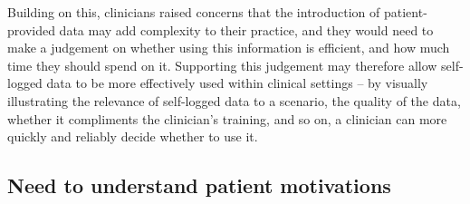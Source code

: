 \documentclass{sigchi}
\begin{document}


Building on this, clinicians raised concerns that the introduction of patient-provided data may add complexity to their practice, and they would need to make a judgement on whether using this information is efficient, and how much time they should spend on it. Supporting this judgement may therefore allow self-logged data to be more effectively used within clinical settings -- by visually illustrating the relevance of self-logged data to a scenario, the quality of the data, whether it compliments the clinician's training, and so on, a clinician can more quickly and reliably decide whether to use it.




\subsection{Need to understand patient motivations} 





\end{document}
